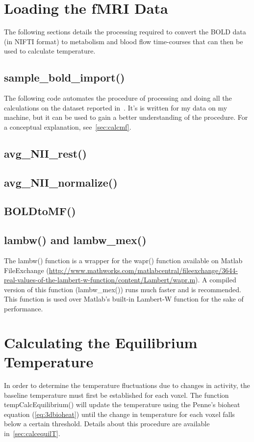 \section{Loading the fMRI Data}
\label{apdx:fmriprocessing}
The following sections details the processing required to convert the BOLD data (in NIFTI format) to metabolism and blood flow time-courses that can then be used to calculate temperature.
\subsection{sample\_bold\_import()}
The following code automates the procedure of processing and doing all the calculations on the dataset reported in~\citet{dhamala}.  It's is written for my data on my machine, but it can be used to gain a better understanding of the procedure. For a conceptual explanation, see~\cref{sec:calcmf}.

\subsection{avg\_NII\_rest()}

\subsection{avg\_NII\_normalize()}

\subsection{BOLDtoMF()}

\subsection{lambw() and lambw\_mex()}
The lambw() function is a wrapper for the wapr() function available on Matlab FileExchange (\url{http://www.mathworks.com/matlabcentral/fileexchange/3644-real-values-of-the-lambert-w-function/content/Lambert/wapr.m}).  A compiled version of this function (lambw\_mex()) runs much faster and is recommended.  This function is used over Matlab's built-in Lambert-W function for the sake of performance.

\clearpage
\section{Calculating the Equilibrium Temperature}
\label{apdx:findequil}
In order to determine the temperature fluctuations due to changes in activity, the baseline temperature must first be established for each voxel.  The function tempCalcEquilibrium() will update the temperature using the Penne's bioheat equation (\cref{eq:3dbioheat}) until the change in temperature for each voxel falls below a certain threshold.  Details about this procedure are available in~\cref{sec:calcequilT}.

